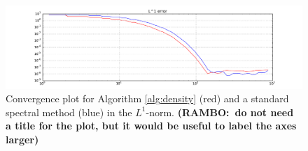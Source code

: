 \documentclass[final,leqno]{siamltex1213}
\newcommand{\ram}[1]{{\normalsize{\textbf{({\color{red}RAMBO:\ }#1)}}}}
\begin{document}
\begin{figure}
	\hspace*{-1.2cm}
	\includegraphics[width=1.17\textwidth]{./images/convergence_plot.pdf}
	\caption{Convergence plot for Algorithm \ref{alg:density} (red) and a standard spectral method (blue) in the $L^{1}$-norm. \ram{do not need a title for the plot, but it would be useful to label the axes larger}}
	\label{fig:convergence}
\end{figure}

%
\end{document}
